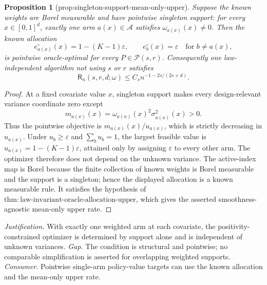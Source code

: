 \documentclass{article}
\newtheorem{proposition}{Proposition}
\begin{document}
\begin{proposition}[prop:singleton-support-mean-only-upper]\label{prop:singleton-support-mean-only-upper}
Suppose the known weights are Borel measurable and have pointwise singleton support: for every \(x\in[0,1]^d\), exactly one arm \(a(x)\in\mathcal A\) satisfies \(\omega_{a(x)}(x)\neq0\). Then the known allocation
\[
e_{a(x)}^{\circ}(x)=1-(K-1)\varepsilon,
\qquad
e_b^{\circ}(x)=\varepsilon\quad\text{for }b\neq a(x),
\]
is pointwise oracle-optimal for every \(P\in\mathcal P(s,r)\). Consequently one law-independent algorithm not using \(s\) or \(r\) satisfies
\[
\mathsf R_n(s,r,d;\omega)
\leq C_s n^{-1-2s/(2s+d)}.
\]
\end{proposition}
\begin{proof}
At a fixed covariate value \(x\), singleton support makes every design-relevant variance coordinate zero except
\[
m_{a(x)}(x)=\omega_{a(x)}(x)^2\sigma_{a(x)}^2(x)>0.
\]
Thus the pointwise objective is \(m_{a(x)}(x)/u_{a(x)}\), which is strictly decreasing in \(u_{a(x)}\). Under \(u_b\geq\varepsilon\) and \(\sum_bu_b=1\), the largest feasible value is \(u_{a(x)}=1-(K-1)\varepsilon\), attained only by assigning \(\varepsilon\) to every other arm. The optimizer therefore does not depend on the unknown variance. The active-index map is Borel because the finite collection of known weights is Borel measurable and the support is a singleton; hence the displayed allocation is a known measurable rule. It satisfies the hypothesis of \(\mathrm{thm{:}law\text{-}invariant\text{-}oracle\text{-}allocation\text{-}upper}\), which gives the asserted smoothness-agnostic mean-only upper rate.
\end{proof}
\par\smallskip\noindent \textit{Justification.} With exactly one weighted arm at each covariate, the positivity-constrained optimizer is determined by support alone and is independent of unknown variances. \textit{Gap.} The condition is structural and pointwise; no comparable simplification is asserted for overlapping weighted supports. \textit{Consumer.} Pointwise single-arm policy-value targets can use the known allocation and the mean-only upper rate.
\end{document}
